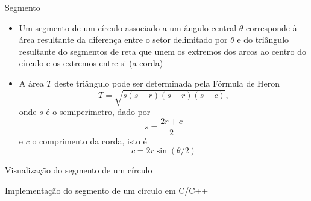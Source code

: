 \begin{frame}[fragile]{Segmento}

    \begin{itemize}
        \item Um segmento de um círculo associado a um ângulo central $\theta$ corresponde à área 
            resultante da diferença entre o setor delimitado por $\theta$ e do triângulo 
            resultante do segmentos de reta que unem os extremos dos arcos ao centro do círculo e 
            os extremos entre si (a corda)
        \pause

        \item A área $T$ deste triângulo pode ser determinada pela Fórmula de Heron
        \[
            T = \sqrt{s(s - r)(s - r)(s - c)},
        \] onde $s$ é o semiperímetro, dado por
        \[
            s = \frac{2r + c}{2}
        \] e $c$ o comprimento da corda, isto é
        \[
            c = 2r\sin(\theta/2)
        \]
    \end{itemize}

\end{frame}

\begin{frame}[fragile]{Visualização do segmento de um círculo}

    \begin{figure}
        \centering
    \end{figure}

\end{frame}

\begin{frame}[fragile]{Implementação do segmento de um círculo em C/C++}
\end{frame}
